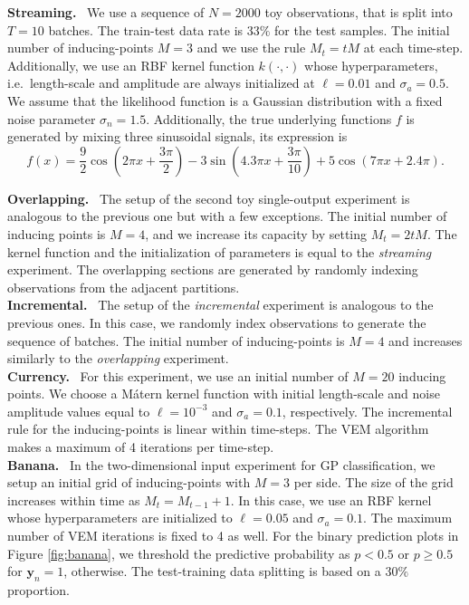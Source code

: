 \documentclass[]{article}
\newcommand{\yc}{\bm{y}}
\begin{document}
\textbf{Streaming.}~ We use a sequence of $N=2000$ toy observations, that is split into $T=10$ batches. The train-test data rate is $33\%$ for the test samples. The initial number of inducing-points $M=3$ and we use the rule $M_t = tM$ at each time-step. Additionally, we use an RBF kernel function $k(\cdot,\cdot)$ whose hyperparameters, i.e.\ length-scale and amplitude are always initialized at $\ell=0.01$ and $\sigma_a=0.5$. We assume that the likelihood function is a Gaussian distribution with a fixed noise parameter $\sigma_n=1.5$. Additionally, the true underlying functions $f$ is generated by mixing three sinusoidal signals, its expression is\\
\begin{equation*}
	f(x) = \frac{9}{2}\cos(2\pi x + \frac{3\pi}{2}) - 3\sin(4.3\pi x + \frac{3\pi}{10}) + 5\cos(7\pi x + 2.4\pi).
\end{equation*}

\textbf{Overlapping.}~ The setup of the second toy single-output experiment is analogous to the previous one but with a few exceptions. The initial number of inducing points is $M=4$, and we increase its capacity by setting $M_t = 2tM$. The kernel function and the initialization of parameters is equal to the \textit{streaming} experiment. The overlapping sections are generated by randomly indexing observations from the adjacent partitions.\\

\textbf{Incremental.}~ The setup of the \textit{incremental} experiment is analogous to the previous ones. In this case, we randomly index observations to generate the sequence of batches. The initial number of inducing-points is $M=4$ and increases similarly to the \textit{overlapping} experiment.\\

\textbf{Currency.}~ For this experiment, we use an initial number of $M=20$ inducing points. We choose a M\'atern kernel function with initial length-scale and noise amplitude values equal to $\ell = 10^{-3}$ and $\sigma_a = 0.1$, respectively. The incremental rule for the inducing-points is linear within time-steps. The VEM algorithm makes a maximum of 4 iterations per time-step.\\

\textbf{Banana.}~ In the two-dimensional input experiment for GP classification, we setup an initial grid of inducing-points with $M=3$ per side. The size of the grid increases within time as $M_t = M_{t-1} + 1$. In this case, we use an RBF kernel whose hyperparameters are initialized to $\ell=0.05$ and $\sigma_a = 0.1$. The maximum number of VEM iterations is fixed to 4 as well. For the binary prediction plots in Figure \ref{fig:banana}, we threshold the predictive probability as $p<0.5$ or $p\geq 0.5$ for $\yc_n = 1$, otherwise. The test-training data splitting is based on a $30\%$ proportion.\\
\end{document}
